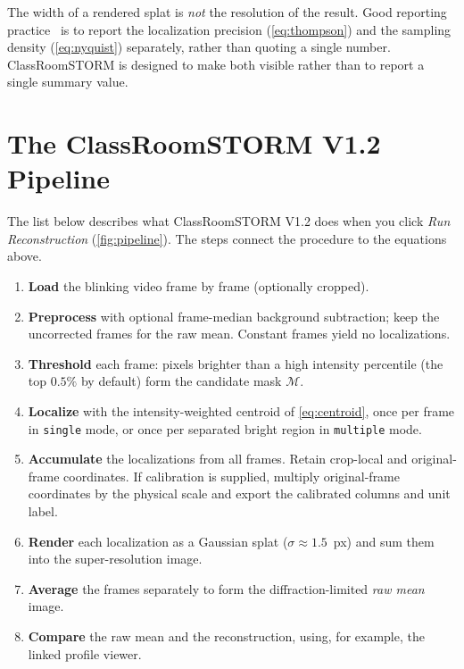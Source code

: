 \documentclass[11pt,a4paper]{article}
\newcommand{\app}{ClassRoomSTORM}
\begin{document}
\begin{cswarn}
The width of a rendered splat is \emph{not} the resolution of the result. Good reporting practice~\cite{prakash2024} is to report the localization precision
(\cref{eq:thompson}) and the sampling density (\cref{eq:nyquist}) separately,
rather than quoting a single number. \app{} is designed to make both visible
rather than to report a single summary value.
\end{cswarn}

\section{The \app{} V1.2 Pipeline}
\label{sec:pipeline}

The list below describes what \app{} V1.2 does
when you click \emph{Run Reconstruction} (\cref{fig:pipeline}). The steps connect the procedure to the equations above.

\begin{enumerate}
  \item \textbf{Load} the blinking video frame by frame (optionally cropped).
  \item \textbf{Preprocess} with optional frame-median background subtraction;
        keep the uncorrected frames for the raw mean. Constant frames yield
        no localizations.
  \item \textbf{Threshold} each frame: pixels brighter than a high intensity
        percentile (the top $0.5\%$ by default) form the candidate mask $\mathcal{M}$.
  \item \textbf{Localize} with the intensity-weighted centroid of
        \cref{eq:centroid}, once per frame in \texttt{single} mode, or once
        per separated bright region in \texttt{multiple} mode.
  \item \textbf{Accumulate} the localizations from all frames.
        Retain crop-local and original-frame coordinates. If calibration is
        supplied, multiply original-frame coordinates by the physical scale
        and export the calibrated columns and unit label.
  \item \textbf{Render} each localization as a Gaussian splat
        ($\sigma \approx 1.5$~px) and sum them into the super-resolution image.
  \item \textbf{Average} the frames separately to form the diffraction-limited
        \emph{raw mean} image.
  \item \textbf{Compare} the raw mean and the reconstruction, using, for example, the linked profile viewer.
\end{enumerate}
\end{document}
